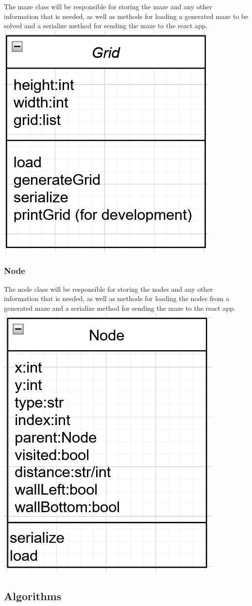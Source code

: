 \documentclass{article}
\begin{document}
The maze class will be responsible for storing the maze and any other information that is needed, as well as methods for loading a generated maze to be solved and a serialize method for sending the maze to the react app.
\newline
\includegraphics[width=0.5\linewidth]{assets/class diagrams/maze.PNG}

\subsubsection{Node}

The node class will be responsible for storing the nodes and any other information that is needed, as well as methods for loading the nodes from a generated maze and a serialize method for sending the maze to the react app.
\newline
\includegraphics[width=0.5\linewidth]{assets/class diagrams/node.PNG}

\subsection{Algorithms}
\end{document}
